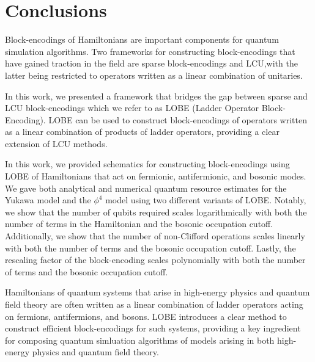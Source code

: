 \section{Conclusions}
\label{sec:conclusions}

Block-encodings of Hamiltonians are important components for quantum simulation algorithms.
Two frameworks for constructing block-encodings that have gained traction in the field are sparse block-encodings and LCU,with the latter being restricted to operators written as a linear combination of unitaries.

In this work, we presented a framework that bridges the gap between sparse and LCU block-encodings which we refer to as LOBE (Ladder Operator Block-Encoding).
LOBE can be used to construct block-encodings of operators written as a linear combination of products of ladder operators, providing a clear extension of LCU methods.

In this work, we provided schematics for constructing block-encodings using LOBE of Hamiltonians that act on fermionic, antifermionic, and bosonic modes.
We gave both analytical and numerical quantum resource estimates for the Yukawa model and the $\phi^4$ model using two different variants of LOBE.
Notably, we show that the number of qubits required scales logarithmically with both the number of terms in the Hamiltonian and the bosonic occupation cutoff.
Additionally, we show that the number of non-Clifford operations scales linearly with both the number of terms and the bosonic occupation cutoff.
Lastly, the rescaling factor of the block-encoding scales polynomially with both the number of terms and the bosonic occupation cutoff.

Hamiltonians of quantum systems that arise in high-energy physics and quantum field theory are often written as a linear combination of ladder operators acting on fermions, antifermions, and bosons.
LOBE introduces a clear method to construct efficient block-encodings for such systems, providing a key ingredient for composing quantum simluation algorithms of models arising in both high-energy physics and quantum field theory.